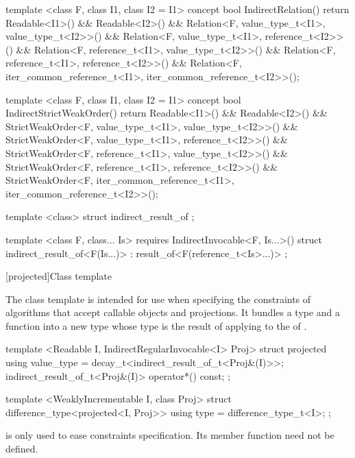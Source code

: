 \begin{codeblock}
  template <class F, class I1, class I2 = I1>
  concept bool IndirectRelation() {
    return Readable<I1>() && Readable<I2>() &&
      Relation<F, value_type_t<I1>, value_type_t<I2>>() &&
      Relation<F, value_type_t<I1>, reference_t<I2>>() &&
      Relation<F, reference_t<I1>, value_type_t<I2>>() &&
      Relation<F, reference_t<I1>, reference_t<I2>>() &&
      Relation<F, iter_common_reference_t<I1>, iter_common_reference_t<I2>>();
  }

  template <class F, class I1, class I2 = I1>
  concept bool IndirectStrictWeakOrder() {
    return Readable<I1>() && Readable<I2>() &&
      StrictWeakOrder<F, value_type_t<I1>, value_type_t<I2>>() &&
      StrictWeakOrder<F, value_type_t<I1>, reference_t<I2>>() &&
      StrictWeakOrder<F, reference_t<I1>, value_type_t<I2>>() &&
      StrictWeakOrder<F, reference_t<I1>, reference_t<I2>>() &&
      StrictWeakOrder<F, iter_common_reference_t<I1>, iter_common_reference_t<I2>>();
  }

  template <class> struct indirect_result_of { };

  template <class F, class... Is>
    requires IndirectInvocable<F, Is...>()
  struct indirect_result_of<F(Is...)> :
    result_of<F(reference_t<Is>...)> { };
\end{codeblock}

[projected]{Class template }

\pnum
The  class template is intended for use when specifying the constraints of
algorithms that accept callable objects and projections. It bundles a  type
 and a function  into a new  type whose
 type is the result of applying  to the
 of .

%
\begin{codeblock}
  template <Readable I, IndirectRegularInvocable<I> Proj>
  struct projected {
    using value_type = decay_t<indirect_result_of_t<Proj&(I)>>;
    indirect_result_of_t<Proj&(I)> operator*() const;
  };

  template <WeaklyIncrementable I, class Proj>
  struct difference_type<projected<I, Proj>> {
    using type = difference_type_t<I>;
  };
\end{codeblock}

\pnum
\enternote {} is only used to ease constraints specification. Its
member function need not be defined.\exitnote

